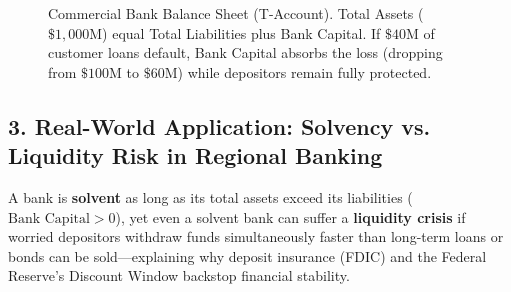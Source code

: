 \documentclass[11pt,letterpaper]{article}
\begin{document}
\begin{figure}[htbp]
\centering
{}
\caption{Commercial Bank Balance Sheet (T-Account). Total Assets ($\$1{,}000\text{M}$) equal Total Liabilities plus Bank Capital. If $\$40\text{M}$ of customer loans default, Bank Capital absorbs the loss (dropping from $\$100\text{M}$ to $\$60\text{M}$) while depositors remain fully protected.}
\label{fig:bank_balance_sheet}
\end{figure}

\subsection*{3. Real-World Application: Solvency vs. Liquidity Risk in Regional Banking}
A bank is \textbf{solvent} as long as its total assets exceed its liabilities ($\text{Bank Capital} > 0$), yet even a solvent bank can suffer a \textbf{liquidity crisis} if worried depositors withdraw funds simultaneously faster than long-term loans or bonds can be sold—explaining why deposit insurance (FDIC) and the Federal Reserve's Discount Window backstop financial stability.
\end{document}
